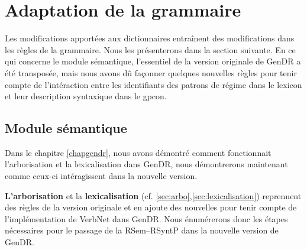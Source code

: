 \section{Adaptation de la grammaire}

Les modifications apportées aux dictionnaires entraînent des modifications dans les règles de la grammaire. Nous les présenterons dans la section suivante. En ce qui concerne le module sémantique, l'essentiel de la version originale de GenDR a été transposée, mais nous avons dû façonner quelques nouvelles règles pour tenir compte de l'intéraction entre les identifiants des patrons de régime dans le lexicon et leur description syntaxique dans le gpcon.

\subsection{Module sémantique}

Dans le chapitre \ref{chapgendr}, nous avons démontré comment fonctionnait l'arborisation et la lexicalisation dans GenDR, nous démontrerons maintenant comme ceux-ci intéragissent dans la nouvelle version.

\textbf{L'arborisation} et la \textbf{lexicalisation} (cf. \ref{sec:arbo},\ref{sec:lexicalisation}) reprennent des règles de la version originale et en ajoute des nouvelles pour tenir compte de l'implémentation de VerbNet dans GenDR. Nous énumérerons donc les étapes nécessaires pour le passage de la \ac{RSem}--\ac{RSyntP} dans la nouvelle version de GenDR.

